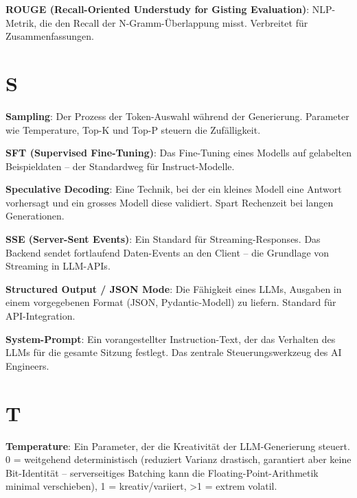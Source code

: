 \textbf{ROUGE (Recall-Oriented Understudy for Gisting Evaluation)}\hspace{0pt}: NLP-Metrik, die den Recall der N-Gramm-Überlappung misst. Verbreitet für Zusammenfassungen.

\section{S}

\textbf{Sampling}\hspace{0pt}: Der Prozess der Token-Auswahl während der Generierung. Parameter wie Temperature, Top-K und Top-P steuern die Zufälligkeit.

\textbf{SFT (Supervised Fine-Tuning)}\hspace{0pt}: Das Fine-Tuning eines Modells auf gelabelten Beispieldaten -- der Standardweg für Instruct-Modelle.

\textbf{Speculative Decoding}\hspace{0pt}: Eine Technik, bei der ein kleines Modell eine Antwort vorhersagt und ein grosses Modell diese validiert. Spart Rechenzeit bei langen Generationen.

\textbf{SSE (Server-Sent Events)}\hspace{0pt}: Ein Standard für Streaming-Responses. Das Backend sendet fortlaufend Daten-Events an den Client -- die Grundlage von Streaming in LLM-APIs.

\textbf{Structured Output / JSON Mode}\hspace{0pt}: Die Fähigkeit eines LLMs, Ausgaben in einem vorgegebenen Format (JSON, Pydantic-Modell) zu liefern. Standard für API-Integration.

\textbf{System-Prompt}\hspace{0pt}: Ein vorangestellter Instruction-Text, der das Verhalten des LLMs für die gesamte Sitzung festlegt. Das zentrale Steuerungswerkzeug des AI Engineers.

\section{T}

\textbf{Temperature}\hspace{0pt}: Ein Parameter, der die Kreativität der LLM-Generierung steuert. 0 = weitgehend deterministisch (reduziert Varianz drastisch, garantiert aber keine Bit-Identität -- serverseitiges Batching kann die Floating-Point-Arithmetik minimal verschieben), 1 = kreativ/variiert, >1 = extrem volatil.

